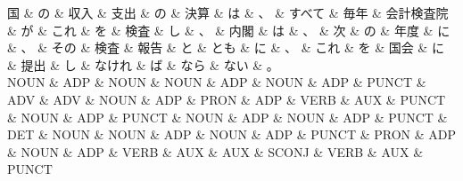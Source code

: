 \documentclass[tikz,border=5pt]{standalone}
\begin{document}
\small
\begin{dependency}[edge unit distance=11.4pt]
    \begin{deptext}[column sep=0.5em]
        国 \& の \& 収入 \& 支出 \& の \& 決算 \& は \& 、 \& すべて \& 毎年 \& 会計検査院 \& が \& これ \& を \& 検査 \& し \& 、 \& 内閣 \& は \& 、 \& 次 \& の \& 年度 \& に \& 、 \& その \& 検査 \& 報告 \& と \& とも \& に \& 、 \& これ \& を \& 国会 \& に \& 提出 \& し \& なけれ \& ば \& なら \& ない \& 。\\
        NOUN \& ADP \& NOUN \& NOUN \& ADP \& NOUN \& ADP \& PUNCT \& ADV \& ADV \& NOUN \& ADP \& PRON \& ADP \& VERB \& AUX \& PUNCT \& NOUN \& ADP \& PUNCT \& NOUN \& ADP \& NOUN \& ADP \& PUNCT \& DET \& NOUN \& NOUN \& ADP \& NOUN \& ADP \& PUNCT \& PRON \& ADP \& NOUN \& ADP \& VERB \& AUX \& AUX \& SCONJ \& VERB \& AUX \& PUNCT\\
    \end{deptext}
\end{dependency}
\end{document}
